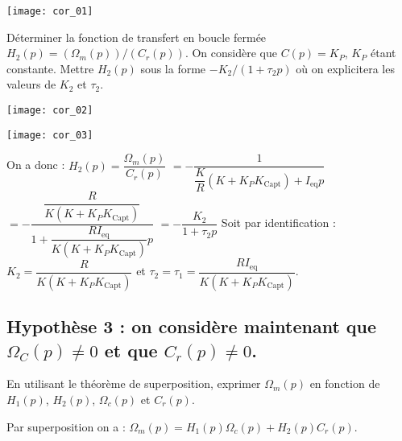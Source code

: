 \ifprof
\begin{corrige}
\begin{center}
\texttt{[image: cor\_01]}
\end{center}
\end{corrige}
\else
\fi


\begin{question}
Déterminer la fonction de transfert en boucle fermée $H_2 (p)=(\Omega_m (p))/(C_r (p))$. On considère que $C(p)=K_P$, $K_P$ étant constante. Mettre $H_2 (p)$ sous la forme $-K_2/(1+\tau_2 p)$ où on explicitera les valeurs de $K_2$ et $\tau_2$.
\end{question}

\ifprof
\begin{corrige}
\begin{center}
\texttt{[image: cor\_02]}
\end{center}
\begin{center}
\texttt{[image: cor\_03]}
\end{center}
On a donc :	
$H_2 (p)=\dfrac{\Omega_m (p)}{C_r (p)}$
$=-\dfrac{1}{\dfrac{K}{R} \left(K+K_P K_{\text{Capt}} \right)+I_{\text{eq}} p}$
$=-\dfrac{\dfrac{R}{K \left(K+K_P  K_{\text{Capt}} \right) }}{1+\dfrac{R I_{\text{eq}}}{K \left(K+K_P K_{\text{Capt}} \right) } p}$
$=-\dfrac{K_2}{1+\tau_2 p}$
Soit par identification : $K_2=\dfrac{R}{K \left(K+K_P  K_{\text{Capt}} \right) }$	et	$\tau_2=\tau_1=\dfrac{R I_{\text{eq}}}{K (K+K_P K_{\text{Capt}} ) }$.





\end{corrige}
\else
\fi


\subsection*{Hypothèse 3 : on considère maintenant que  $\Omega_C (p)\neq 0$ et que $C_r (p)\neq 0$.}
\begin{question}
En utilisant le théorème de superposition, exprimer $\Omega_m (p)$ en fonction de $H_1 (p)$, $H_2 (p)$, $\Omega_c (p)$ et $C_r (p)$.
\end{question}

\ifprof
\begin{corrige}

Par superposition on a : $\Omega_m (p)=H_1 (p) \Omega_c (p)+H_2 (p) C_r (p)$.
\end{corrige}
\else
\fi


